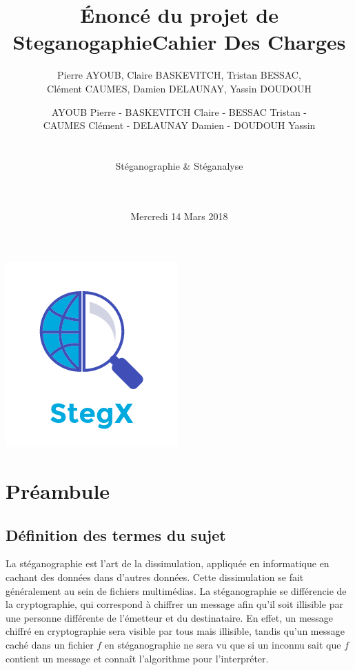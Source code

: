 \documentclass[11pt]{article}
\title{Énoncé du projet de Steganogaphie}
\author{Pierre AYOUB, Claire BASKEVITCH, Tristan BESSAC, \\
Clément CAUMES, Damien DELAUNAY, Yassin DOUDOUH}
\date{Mercredi 14 Mars 2018}
\begin{document}
\title{\Huge{\textbf{Cahier Des Charges}}}
	\author{AYOUB Pierre - BASKEVITCH Claire - BESSAC Tristan - \\
		CAUMES Clément - DELAUNAY Damien - DOUDOUH Yassin \\ \\ \\
		Stéganographie \& Stéganalyse \\ \\ \\}
		

	\begin{titlepage}
		\maketitle
		\vspace{20em}
		\begin{center}\includegraphics{application.png}\end{center}
	\end{titlepage}

\section{Préambule}

\subsection{Définition des termes du sujet}
La stéganographie est l'art de la dissimulation, appliquée en informatique en
cachant des données dans d'autres données. Cette dissimulation se fait
généralement au sein de fichiers multimédias. 
La stéganographie se différencie de la cryptographie, qui correspond à chiffrer un message afin qu'il soit illisible par une personne différente de l'émetteur 
et du destinataire. 
En effet, un message chiffré en cryptographie sera visible par tous mais illisible, tandis qu'un message caché dans un fichier $f$ en stéganographie ne sera vu que si un inconnu sait que $f$ contient un message et connaît l'algorithme pour l'interpréter. 
\end{document}
